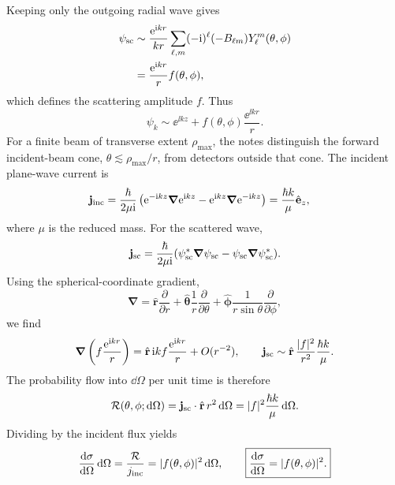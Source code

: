 Keeping only the outgoing radial wave gives
\begin{align*}
 \psi_{\rm sc}&\sim\frac{\mathrm{e}^{\mathrm{i} kr}}{kr}
 \sum_{\ell,m}(-\mathrm{i})^\ell(-B_{\ell m})Y_\ell^m(\theta,\phi)\\
 &=\frac{\mathrm{e}^{\mathrm{i} kr}}r f(\theta,\phi),
\end{align*}
which defines the scattering amplitude $f$. Thus
\[
 \boxed{\psi_k\sim\ee^{\ii kz}
              +f(\theta,\phi)\frac{\ee^{\ii kr}}r.}
\]
For a finite beam of transverse extent $\rho_{\max}$, the notes distinguish
the forward incident-beam cone, $\theta\lesssim\rho_{\max}/r$, from
detectors outside that cone. The incident plane-wave current is
\begin{align*}
 \mathbf j_{\rm inc}
 &=\frac{\hbar}{2\mu\mathrm{i}}
 \left(\mathrm{e}^{-\mathrm{i} kz}\boldsymbol\nabla\mathrm{e}^{\mathrm{i} kz}
      -\mathrm{e}^{\mathrm{i} kz}\boldsymbol\nabla\mathrm{e}^{-\mathrm{i} kz}\right)
 =\frac{\hbar k}{\mu}\hat{\mathbf e}_z,
\end{align*}
where $\mu$ is the reduced mass. For the scattered wave,
\[
 \mathbf j_{\rm sc}=\frac{\hbar}{2\mu\mathrm{i}}
 (\psi_{\rm sc}^*\boldsymbol\nabla\psi_{\rm sc}
           -\psi_{\rm sc}\boldsymbol\nabla\psi_{\rm sc}^*).
\]
Using the spherical-coordinate gradient,
\[
 \boldsymbol\nabla
 =\hat{\mathbf r}\frac\partial{\partial r}
  +\hat{\boldsymbol\theta}\frac1r\frac\partial{\partial\theta}
  +\hat{\boldsymbol\phi}\frac1{r\sin\theta}\frac\partial{\partial\phi},
\]
we find
\[
 \boldsymbol\nabla\left(f\frac{\mathrm{e}^{\mathrm{i} kr}}r\right)
 =\hat{\mathbf r}\,\mathrm{i} kf\frac{\mathrm{e}^{\mathrm{i} kr}}r+O(r^{-2}),
 \qquad
 \mathbf j_{\rm sc}\sim
 \hat{\mathbf r}\,\frac{|f|^2}{r^2}\frac{\hbar k}{\mu}.
\]
The probability flow into $\dd\Omega$ per unit time is therefore
\[
 \mathcal R(\theta,\phi;\mathop{}\!\mathrm{d}\Omega)
 =\mathbf j_{\rm sc}\cdot\hat{\mathbf r}\,r^2\mathop{}\!\mathrm{d}\Omega
 =|f|^2\frac{\hbar k}{\mu}\mathop{}\!\mathrm{d}\Omega.
\]
Dividing by the incident flux yields
\[
 \frac{\mathop{}\!\mathrm{d}\sigma}{\mathop{}\!\mathrm{d}\Omega}\mathop{}\!\mathrm{d}\Omega
 =\frac{\mathcal R}{j_{\rm inc}}=|f(\theta,\phi)|^2\mathop{}\!\mathrm{d}\Omega,
 \qquad\boxed{\frac{\mathop{}\!\mathrm{d}\sigma}{\mathop{}\!\mathrm{d}\Omega}=|f(\theta,\phi)|^2.}
\]
